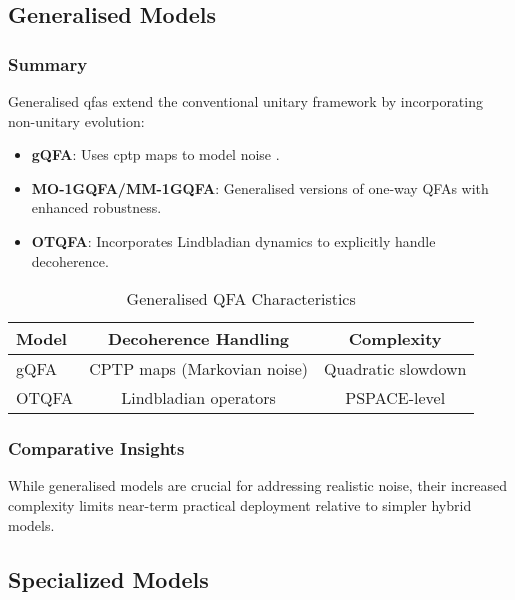 \subsection*{Generalised Models}

\subsubsection{Summary}
Generalised \glspl{qfa} extend the conventional unitary framework by incorporating non-unitary evolution:
\begin{itemize}
    \item \textbf{gQFA}: Uses \gls{cptp} maps to model noise \cite{gruska2005}.
    \item \textbf{MO-1GQFA/MM-1GQFA}: Generalised versions of one-way QFAs with enhanced robustness.
    \item \textbf{OTQFA}: Incorporates Lindbladian dynamics to explicitly handle decoherence.
\end{itemize}

\begin{table}[ht]
\centering
\label{tab:general}
\begin{tabular}{|l|c|c|}
\hline
\textbf{Model} & \textbf{Decoherence Handling} & \textbf{Complexity} \\ \hline
gQFA   & CPTP maps (Markovian noise) & Quadratic slowdown \\ \hline
OTQFA & Lindbladian operators & PSPACE-level \\ \hline
\end{tabular}
\caption{Generalised QFA Characteristics}
\end{table}

\subsubsection{Comparative Insights}
While generalised models are crucial for addressing realistic noise, their increased complexity limits near-term practical deployment relative to simpler hybrid models.

\subsection*{Specialized Models}

